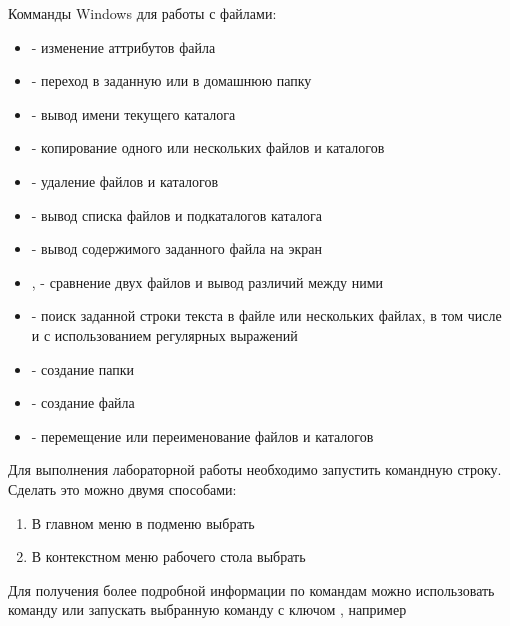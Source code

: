 \documentclass[a4paper,12pt]{article}
\begin{document}
  
    \begin{flushleft}
        Комманды Windows для работы с файлами:
        \begin{itemize}
            \item {} - изменение аттрибутов файла
            \item {} - переход в заданную или в домашнюю папку
            \item {} - вывод имени текущего каталога
            \item {} - копирование одного или нескольких файлов и каталогов
            \item {} - удаление файлов и каталогов
            \item {} - вывод списка файлов и подкаталогов каталога
            \item {} - вывод содержимого заданного файла на экран
            \item {},  - сравнение двух файлов и вывод различий между ними
            \item {} - поиск заданной строки текста в файле или нескольких файлах, в том числе и с использованием регулярных выражений
            \item {} - создание папки
            \item {} - создание файла
            \item {} - перемещение или переименование файлов и каталогов
        \end{itemize}
    \end{flushleft}
  
    \begin{flushleft}
        Для выполнения лабораторной работы необходимо запустить командную строку. Сделать это можно двумя способами:
        \begin{enumerate}
            \item В главном меню в подменю  выбрать 
            \item В контекстном меню рабочего стола выбрать 
        \end{enumerate}
    \end{flushleft}
  
    \begin{flushleft}
        Для получения более подробной информации по командам можно использовать команду  или запускать выбранную команду с ключом , например 
    \end{flushleft}
  
\end{document}
